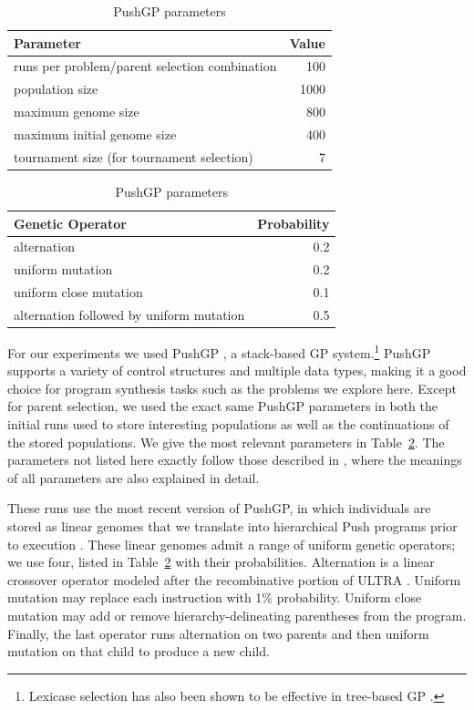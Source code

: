 \documentclass{sig-alternate-05-2015}
\begin{document}
\begin{table}[t]
\centering
\caption{PushGP parameters}
\label{table:parameters}
\begin{tabular}{l r}
\toprule
\textbf{Parameter} & \textbf{Value} \tabularnewline
\midrule
runs per problem/parent selection combination & 100 \tabularnewline
population size & 1000 \tabularnewline
maximum genome size & 800 \tabularnewline
maximum initial genome size & 400 \tabularnewline
tournament size (for tournament selection) & 7 \tabularnewline
\midrule
\end{tabular}
\begin{tabular}{l r}
\textbf{Genetic Operator} & \textbf{Probability} \tabularnewline
\midrule
alternation & 0.2 \tabularnewline
uniform mutation & 0.2 \tabularnewline
uniform close mutation & 0.1 \tabularnewline
alternation followed by uniform mutation & 0.5 \tabularnewline
\bottomrule
\end{tabular}
\vspace{-0.25 cm}
\end{table}

For our experiments we used PushGP \cite{spector:2002:GPEM, 1068292}, a stack-based GP system.\footnote{Lexicase selection has also been shown to be effective in tree-based GP \cite{Helmuth:2015:ieeeTEC, Krawiec:2015:GECCO:smgpWorkshop}.} PushGP supports a variety of control structures and multiple data types, making it a good choice for program synthesis tasks such as the problems we explore here.
Except for parent selection, we used the exact same PushGP parameters in both the initial runs used to store interesting populations as well as the continuations of the stored populations. We give the most relevant parameters in Table~\ref{table:parameters}. The parameters not listed here exactly follow those described in \cite{Helmuth:2015:dissertation}, where the meanings of all parameters are also explained in detail.

These runs use the most recent version of PushGP, in which individuals are stored as linear genomes that we translate into hierarchical Push programs prior to execution \cite{Helmuth:2015:dissertation}. These linear genomes admit a range of uniform genetic operators; we use four, listed in Table~\ref{table:parameters} with their probabilities. Alternation is a linear crossover operator modeled after the recombinative portion of ULTRA \cite{Spector:2013:GPTP}. Uniform mutation may replace each instruction with 1\% probability. Uniform close mutation may add or remove hierarchy-delineating parentheses from the program.
Finally, the last operator runs alternation on two parents and then uniform mutation on that child to produce a new child.
\end{document}
